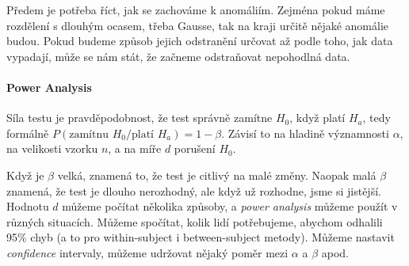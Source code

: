 Předem je potřeba říct, jak se zachováme k anomáliím. Zejména pokud máme rozdělení s dlouhým ocasem, třeba Gausse, tak na kraji určitě nějaké anomálie budou. Pokud budeme způsob jejich odstranění určovat až podle toho, jak data vypadají, může se nám stát, že začneme odstraňovat nepohodlná data.

\paragraph{Power Analysis}

Síla testu je pravděpodobnost, že test správně zamítne $H_0$, když platí $H_a$, tedy formálně $P(\text{zamítnu~} H_0/\text{platí~} H_a) = 1 - \beta$. Závisí to na hladině významnosti $\alpha$, na velikosti vzorku $n$, a na míře $d$ porušení $H_0$.

Když je $\beta$ velká, znamená to, že test je citlivý na malé změny. Naopak malá $\beta$ znamená, že test je dlouho nerozhodný, ale když už rozhodne, jsme si jistější. Hodnotu $d$ můžeme počítat několika způsoby, a \textit{power analysis} můžeme použít v různých situacích. Můžeme spočítat, kolik lidí potřebujeme, abychom odhalili 95\% chyb (a to pro within-subject i between-subject metody). Můžeme nastavit \textit{confidence} intervaly, můžeme udržovat nějaký poměr mezi $\alpha$ a $\beta$ apod.

